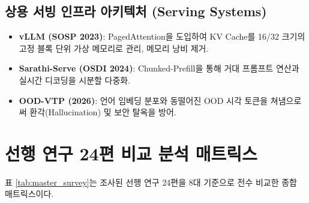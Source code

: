 \documentclass[10pt, a4paper, twocolumn]{article}
\begin{document}
\subsection{상용 서빙 인프라 아키텍처 (Serving Systems)}
\begin{itemize}
    \item \textbf{vLLM (SOSP 2023)}: PagedAttention을 도입하여 KV Cache를 16/32 크기의 고정 블록 단위 가상 메모리로 관리, 메모리 낭비 제거.
    \item \textbf{Sarathi-Serve (OSDI 2024)}: Chunked-Prefill을 통해 거대 프롬프트 연산과 실시간 디코딩을 시분할 다중화.
    \item \textbf{OOD-VTP (2026)}: 언어 임베딩 분포와 동떨어진 OOD 시각 토큰을 쳐냄으로써 환각(Hallucination) 및 보안 탈옥을 방어.
\end{itemize}

\section{선행 연구 24편 비교 분석 매트릭스}
표 \ref{tab:master_survey}는 조사된 선행 연구 24편을 8대 기준으로 전수 비교한 종합 매트릭스이다.
\end{document}

